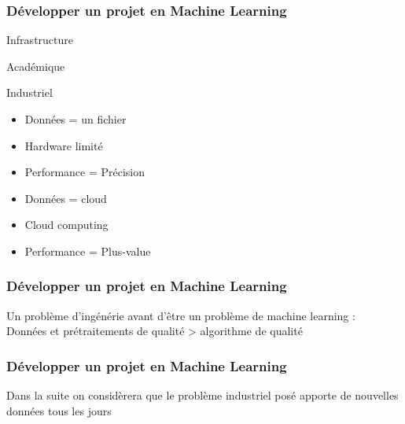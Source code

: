 \documentclass{formation}
\begin{document}
\begin{frame}
  \frametitle{Développer un projet en Machine Learning}
  \begin{center}
    Infrastructure
  \end{center}
  \begin{minipage}[c]{0.49\linewidth}
    \begin{center}
      Académique
      \newline
    \end{center}
  \end{minipage}\hfill
  \begin{minipage}[c]{0.49\linewidth}
    \begin{center}
      Industriel
      \newline
    \end{center}
  \end{minipage}\hfill
  \begin{minipage}[c]{0.49\linewidth}
    \begin{itemize}
    \item Données = un fichier
    \item Hardware limité
    \item Performance = Précision
    \end{itemize}
  \end{minipage}\hfill
  \vrule{}
  \begin{minipage}[c]{0.49\linewidth}
    \begin{itemize}
    \item Données = cloud
    \item Cloud computing
    \item Performance = Plus-value
    \end{itemize}
  \end{minipage}\hfill
\end{frame}

\begin{frame}
  \frametitle{Développer un projet en Machine Learning}
  Un problème d'ingénérie avant d'être un problème de machine learning : \\
  Données et prétraitements de qualité > algorithme de qualité 
\end{frame}


\begin{frame}
  \frametitle{Développer un projet en Machine Learning}
  Dans la suite on considèrera que le problème industriel posé apporte de nouvelles données tous les jours
\end{frame}
\end{document}
